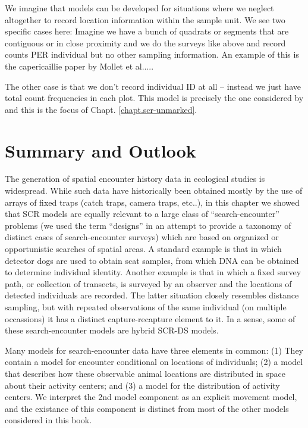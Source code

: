 We imagine that models can be developed for
situations where we neglect
altogether to record location information within the sample unit.
We see two specific cases here:
Imagine we have a bunch of quadrats or segments that are contiguous or
in close proximity
and we do the surveys like above and record counts PER individual  but
no other sampling information. An example of this is the capericaillie
paper by Mollet et al.....

The other case is that we don't record individual ID at all -- instead
we just have total count frequencies in each plot.
This model is precisely the one considered by
\citep{chandler_royle:2012} and this is the focus of Chapt. \ref{chapt.scr-unmarked}.





\section{Summary and Outlook}

The generation of spatial encounter history data in ecological studies
is widespread. While such data have historically been obtained mostly
by the use of arrays of fixed traps (catch traps, camera traps,
etc..), in this chapter we showed that SCR models are equally relevant
to a large class of ``search-encounter'' problems (we used the term
``designs'' in an attempt to provide a taxonomy of distinct cases of
search-encounter surveys) which are based on organized or
opportunistic searches of spatial areas. A standard example is that in
which detector dogs are used to obtain scat samples, from which DNA
can be obtained to determine individual identity.  Another example is
that in which a fixed survey path, or collection of transects, is
surveyed by an observer and the locations of detected individuals are
recorded. The latter situation closely resembles distance sampling,
but with repeated observations of the same individual (on multiple
occassions) it has a distinct capture-recapture element to it. In a
sense, some of these search-encounter models are hybrid SCR-DS models.


Many models for search-encounter data have three elements in common:
(1) They contain a model for encounter conditional on locations of
individuals; (2) a model that describes how these observable animal
locations are distributed in space about their activity centers; and
(3) a model for the distribution of activity centers.  We interpret
the 2nd model component as an explicit movement model, and the
existance of this component is distinct from most of the other models
considered in this book.

